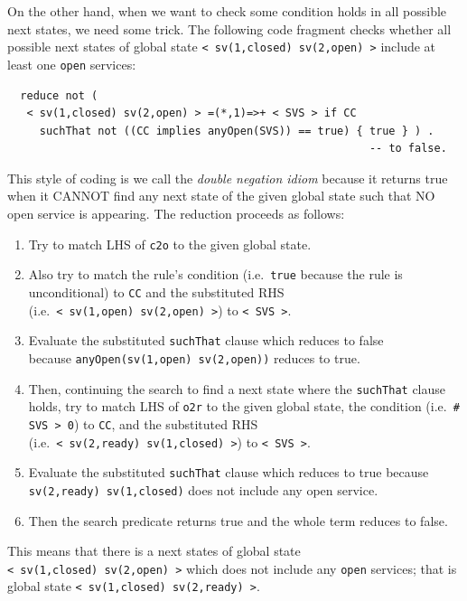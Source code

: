 \documentclass[12pt]{report}
\newcommand{\stt}[1]{{\small{\tt {#1}}}}
\begin{document}
On the other hand, when we want to check some condition holds in all
possible next states, we need some trick. The following code fragment
checks whether all possible next states of global state
\stt{<~sv(1,closed)~sv(2,open)~>} include at least one {\tt open} services:
\small
\begin{verbatim}
  reduce not (
   < sv(1,closed) sv(2,open) > =(*,1)=>+ < SVS > if CC
     suchThat not ((CC implies anyOpen(SVS)) == true) { true } ) .
                                                        -- to false.
\end{verbatim}
\normalsize
This style of coding is we call the {\it double negation idiom}
because it returns true when it CANNOT find any next state of the
given global state such that NO open service is appearing. The reduction
proceeds as follows:
\begin{enumerate}
\item Try to match LHS of {\tt c2o} to the given global state.
\item Also try to match the rule's condition (i.e.\ {\tt true} because
  the rule is unconditional) to {\tt CC} and the substituted RHS
  (i.e.\ \stt{<~sv(1,open)~sv(2,open)~>}) to \stt{<~SVS~>}.
\item Evaluate the substituted {\tt suchThat} clause which reduces to
  false \\ because \stt{anyOpen(sv(1,open) sv(2,open))} reduces to
  true.
\item Then, continuing the search to find a next state where the {\tt suchThat} clause holds,
  try to match LHS of {\tt o2r} to
  the given global state, the condition (i.e.\ \stt{\# SVS > 0}) to {\tt CC},
  and the substituted RHS (i.e.\ \stt{<~sv(2,ready)~sv(1,closed)~>}) to
  \stt{<~SVS~>}.
\item Evaluate the substituted {\tt suchThat} clause which reduces to
  true because \stt{sv(2,ready) sv(1,closed)} does not include any
  open service.
\item Then the search predicate returns true and the whole term
  reduces to false.
\end{enumerate}
This means that there is a next states of global state
\stt{<~sv(1,closed)~sv(2,open)~>} which does not include any {\tt open}
services; that is global state
\stt{<~sv(1,closed)~sv(2,ready)~>}.
\end{document}
